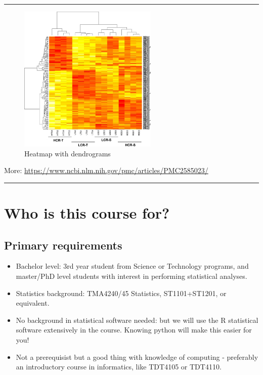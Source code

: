 \documentclass[]{article}
\providecommand{\tightlist}{%
  \setlength{\itemsep}{0pt}\setlength{\parskip}{0pt}}
\begin{document}
\begin{center}\rule{0.5\linewidth}{\linethickness}\end{center}

\begin{figure}
\centering
\includegraphics[width=2.60417in,height=\textheight]{heatmap.png}
\caption{Heatmap with dendrograms}
\end{figure}

More: \url{https://www.ncbi.nlm.nih.gov/pmc/articles/PMC2585023/}

\begin{center}\rule{0.5\linewidth}{\linethickness}\end{center}

\hypertarget{who-is-this-course-for}{%
\section{Who is this course for?}\label{who-is-this-course-for}}

\hypertarget{primary-requirements}{%
\subsection{Primary requirements}\label{primary-requirements}}

\begin{itemize}
\tightlist
\item
  Bachelor level: 3rd year student from Science or Technology programs,
  and master/PhD level students with interest in performing statistical
  analyses.
\item
  Statistics background: TMA4240/45 Statistics, ST1101+ST1201, or
  equivalent.
\item
  No background in statistical software needed: but we will use the R
  statistical software extensively in the course. Knowing python will
  make this easier for you!
\item
  Not a prerequisist but a good thing with knowledge of computing -
  preferably an introductory course in informatics, like TDT4105 or
  TDT4110.
\end{itemize}
\end{document}
